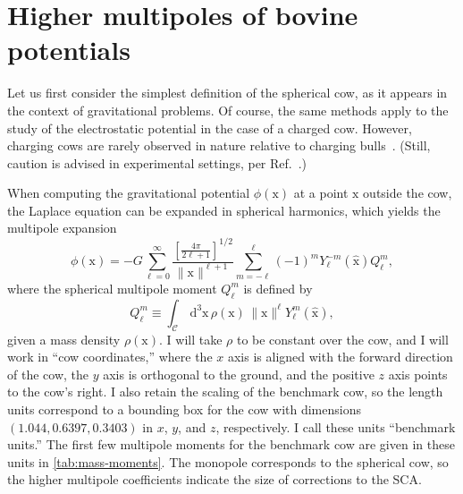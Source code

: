 \documentclass[
    prd, twocolumn, nofootinbib, amsmath, amssymb,
    aps, floatfix, preprintnumbers
]{revtex4-2}
\newcommand{\refcite}[1]{Ref.~\cite{#1}}
\newcommand{\bb}[1]{\bm{\mathrm{#1}}}
\newcommand{\du}{\mathrm{d}}
\newcommand{\dd}{\,\du}
\begin{document}
\section{Higher multipoles of bovine potentials}
\label{sec:multipole-potential}
Let us first consider the simplest definition of the spherical cow, as it appears in the context of gravitational problems. Of course, the same methods apply to the study of the electrostatic potential in the case of a charged cow. However, charging cows are rarely observed in nature relative to charging bulls~\cite{lott:1981,douglass:1999}. (Still, caution is advised in experimental settings, per \refcite{murphy:2010}.)

When computing the gravitational potential $\phi(\bb x)$ at a point $\bb x$ outside the cow, the Laplace equation can be expanded in spherical harmonics, which yields the multipole expansion
\begin{equation}
    \label{eq:spherical-multipole-potential}
    \phi(\bb x) = -G\sum_{\ell = 0}^{\infty}
        \frac{
            \left[\frac{4\pi}{2\ell+1}\right]^{1/2}
        }{\|\bb x\|^{\ell+1}}
        \sum_{m=-\ell}^\ell (-1)^m Y_\ell^{-m}(\bb{\hat x})
        Q_\ell^m
        ,
\end{equation}
where the spherical multipole moment $Q_\ell^m$ is defined by
\begin{equation}
    Q_\ell^m\equiv \int_{\mathcal C}\dd^3\bb x\,
    \rho(\bb x)\,\|\bb x\|^\ell Y_\ell^m(\bb{\hat x})
    ,
\end{equation}
given a mass density $\rho(\bb x)$. I will take $\rho$ to be constant over the cow, and I will work in ``cow coordinates,'' where the $x$ axis is aligned with the forward direction of the cow, the $y$ axis is orthogonal to the ground, and the positive $z$ axis points to the cow's right. I also retain the scaling of the benchmark cow, so the length units correspond to a bounding box for the cow with dimensions $(1.044, 0.6397, 0.3403)$ in $x$, $y$, and $z$, respectively. I call these units ``benchmark units.'' The first few multipole moments for the benchmark cow are given in these units in \cref{tab:mass-moments}. The monopole corresponds to the spherical cow, so the higher multipole coefficients indicate the size of corrections to the SCA\@.
\end{document}
